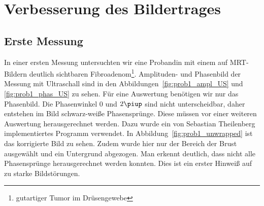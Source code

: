 \documentclass[
    11pt,
    ngerman
]{scrbook}
\begin{document}
\section{Verbesserung des Bildertrages}

\subsection{Erste Messung}

In einer ersten Messung untersuchten wir eine Probandin mit einem auf
MRT-Bildern deutlich sichtbaren Fibroadenom\footnote{gutartiger Tumor im
Drüsengewebe}. Amplituden- und Phasenbild der Messung mit Ultraschall sind in
den Abbildungen~\ref{fig:prob1_ampl_US} und \ref{fig:prob1_phas_US} zu sehen.
Für eine Auswertung benötigen wir nur das Phasenbild. Die Phasenwinkel 0 und
$2\piup$ sind nicht unterscheidbar, daher entstehen im Bild schwarz-weiße
Phasensprünge. Diese müssen vor einer weiteren Auswertung herausgerechnet
werden. Dazu wurde ein von Sebastian Theilenberg implementiertes Programm
verwendet. In Abbildung~\ref{fig:prob1_unwrapped} ist das korrigierte Bild zu
sehen. Zudem wurde hier nur der Bereich der Brust ausgewählt und ein
Untergrund abgezogen. Man erkennt deutlich, dass nicht alle Phasensprünge
herausgerechnet werden konnten. Dies ist ein erster Hinweiß auf zu starke
Bildstörungen.
\end{document}
